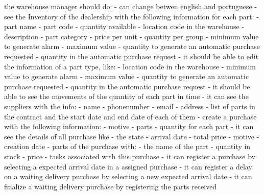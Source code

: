 the warehouse manager should do:
- can change betwen english and portuguese
- see the Inventory of the dealership with the following information for each part:
  - part name
  - part code
  - quantity available
  - location code in the warehouse
  - description
  - part category
  - price per unit
  - quantity per group
  - minimum value to generate alarm
  - maximum value
  - quantity to generate an automatic purchase requested
  - quantity in the automatic purchase request
- it should be able to edit the information of a part type, like:
  - location code in the warehouse
  - minimum value to generate alarm
  - maximum value
  - quantity to generate an automatic purchase requested
  - quantity in the automatic purchase request
- it should be able to see the movements of the quantity of each part in time 
- it can see the suppliers with the info:
  - name
  - phonenumber
  - email
  - address
  - list of parts in the contract and the start date and end date of each of them
- create a purchase with the following information:
  - motive
  - parts
  - quantity for each part
- it can see the details of all purchase like
 - the state
 - arrival date
 - total price
 - motive
 - creation date
 - parts of the purchase with:
  - the name of the part
  - quantity in stock
  - price 
  - tasks associated with this purchase
- it can register a purchase by selecting a expected arrival date in a assigned purchase
- it can register a delay on a waiting delivery purchase by selecting a new expected arrival date
- it can finalize a waiting delivery purchase by registering the parts received

